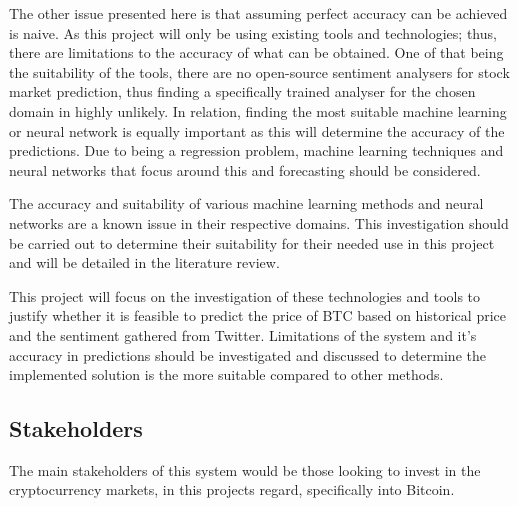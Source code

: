 \documentclass[oneside, 12pt]{article}
\begin{document}
		The other issue presented here is that assuming perfect accuracy can be achieved is naive. As this project will only be using existing tools and technologies; thus, there are limitations to the accuracy of what can be obtained. One of that being the suitability of the tools, there are no open-source sentiment analysers for stock market prediction, thus finding a specifically trained analyser for the chosen domain in highly unlikely. In relation, finding the most suitable machine learning or neural network is equally important as this will determine the accuracy of the predictions. Due to being a regression problem, machine learning techniques and neural networks that focus around this and forecasting should be considered.
		
		The accuracy and suitability of various machine learning methods and neural networks are a known issue in their respective domains. This investigation should be carried out to determine their suitability for their needed use in this project and will be detailed in the literature review.
		
		This project will focus on the investigation of these technologies and tools to justify whether it is feasible to predict the price of BTC based on historical price and the sentiment gathered from Twitter. Limitations of the system and it's accuracy in predictions should be investigated and discussed to determine the implemented solution is the more suitable compared to other methods.  
		
		\subsection{Stakeholders}\label{stakeholders}
		The main stakeholders of this system would be those looking to invest in the cryptocurrency markets, in this projects regard, specifically into Bitcoin. 
		
\end{document}
